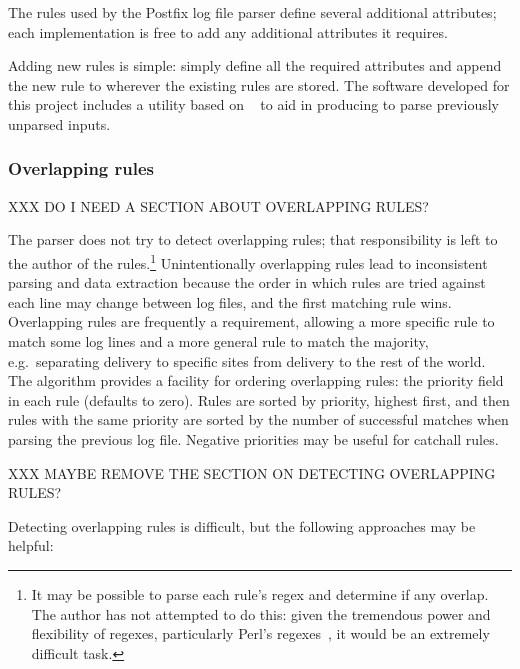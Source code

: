 \documentclass[draft]{svmult}
\begin{document}
The rules used by the Postfix log file parser define several additional
attributes; each implementation is free to add any additional attributes it
requires.

Adding new rules is simple: simply define all the required attributes and
append the new rule to wherever the existing rules are stored.  The
software developed for this project includes a utility based on
\SLCT{}~\cite{slct-paper} to aid in producing \regexes{} to parse
previously unparsed inputs.

\subsubsection{Overlapping rules}

\label{overlapping rules}

XXX DO I NEED A SECTION ABOUT OVERLAPPING RULES\@?

The parser does not try to detect overlapping rules; that responsibility is
left to the author of the rules.\footnote{It may be possible to parse each
rule's regex and determine if any overlap.  The author has not attempted to
do this: given the tremendous power and flexibility of regexes,
particularly Perl's regexes~\cite{perlre}, it would be an extremely
difficult task.} Unintentionally overlapping rules lead to inconsistent
parsing and data extraction because the order in which rules are tried
against each line may change between log files, and the first matching rule
wins.  Overlapping rules are frequently a requirement, allowing a more
specific rule to match some log lines and a more general rule to match the
majority, e.g.\ separating \SMTP{} delivery to specific sites from \SMTP{}
delivery to the rest of the world.  The algorithm provides a facility for
ordering overlapping rules: the priority field in each rule (defaults to
zero).  Rules are sorted by priority, highest first, and then rules with
the same priority are sorted by the number of successful matches when
parsing the previous log file.  Negative priorities may be useful for
catchall rules.

XXX MAYBE REMOVE THE SECTION ON DETECTING OVERLAPPING RULES\@?

Detecting overlapping rules is difficult, but the following approaches may
be helpful:
\end{document}
